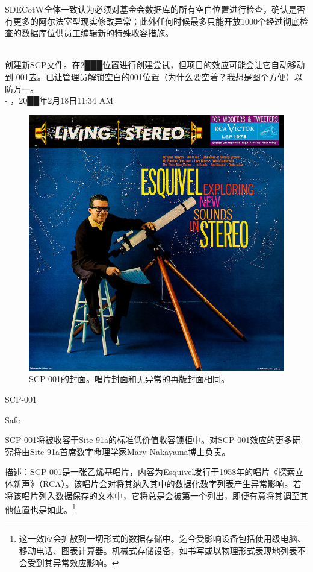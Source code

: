 SDECotW全体一致认为必须对基金会数据库的所有空白位置进行检查，确认是否有更多的阿尔法室型现实修改异常；此外任何时候最多只能开放1000个经过彻底检查的数据库位供员工编辑新的特殊收容措施。


\newpage



\begin{scpbox}
 \\
创建新SCP文件。在2███位置进行创建尝试，但项目的效应可能会让它自动移动到-001去。已让管理员解锁空白的001位置（为什么要空着？我想是图个方便）以防万一。 \\
- ，20██年2月18日11:34 AM
\end{scpbox}

\begin{figure}[H]
	\centering
	\includegraphics[width=0.5\linewidth]{images/SCP-001-a-record-2.jpg}
	\caption*{SCP-001的封面。唱片封面和无异常的再版封面相同。}
\end{figure}

SCP-001

Safe

SCP-001将被收容于Site-91a的标准低价值收容锁柜中。对SCP-001效应的更多研究将由Site-91a首席数字命理学家Mary Nakayama博士负责。

描述：SCP-001是一张乙烯基唱片，内容为Esquivel发行于1958年的唱片《探索立体新声》（RCA）。该唱片会对将其纳入其中的数据化数字列表产生异常影响。若将该唱片列入数据保存的文本中，它将总是会被第一个列出，即便有意将其调至其他位置也是如此。\footnote{这一效应会扩散到一切形式的数据存储中。迄今受影响设备包括使用级电脑、移动电话、图表计算器。机械式存储设备，如书写或以物理形式表现地列表不会受到其异常效应影响。\label{footnote 2}}

